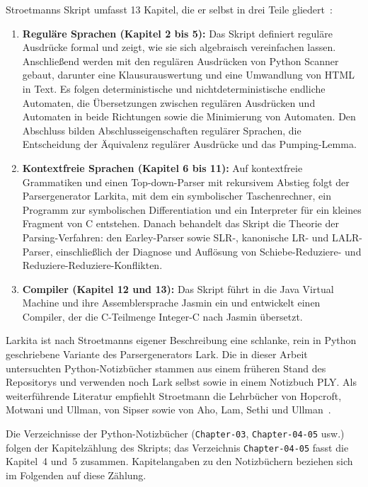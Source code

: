 Stroetmanns Skript umfasst 13 Kapitel, die er selbst in drei Teile gliedert~\cite{stroetmann2026formal}:
\begin{enumerate}
  \item \textbf{Reguläre Sprachen (Kapitel 2 bis 5):} Das Skript definiert reguläre Ausdrücke formal und zeigt, wie sie sich algebraisch vereinfachen lassen.
  Anschließend werden mit den regulären Ausdrücken von Python Scanner gebaut, darunter eine Klausurauswertung und eine Umwandlung von HTML in Text.
  Es folgen deterministische und nichtdeterministische endliche Automaten, die Übersetzungen zwischen regulären Ausdrücken und Automaten in beide Richtungen sowie die Minimierung von Automaten.
  Den Abschluss bilden Abschlusseigenschaften regulärer Sprachen, die Entscheidung der Äquivalenz regulärer Ausdrücke und das Pumping-Lemma.
  \item \textbf{Kontextfreie Sprachen (Kapitel 6 bis 11):} Auf kontextfreie Grammatiken und einen Top-down-Parser mit rekursivem Abstieg folgt der Parsergenerator Larkita, mit dem ein symbolischer Taschenrechner, ein Programm zur symbolischen Differentiation und ein Interpreter für ein kleines Fragment von C entstehen.
  Danach behandelt das Skript die Theorie der Parsing-Verfahren: den Earley-Parser sowie SLR-, kanonische LR- und LALR-Parser, einschließlich der Diagnose und Auflösung von Schiebe-Reduziere- und Reduziere-Reduziere-Konflikten.
  \item \textbf{Compiler (Kapitel 12 und 13):} Das Skript führt in die Java Virtual Machine und ihre Assemblersprache Jasmin ein und entwickelt einen Compiler, der die C-Teilmenge Integer-C nach Jasmin übersetzt.
\end{enumerate}

Larkita ist nach Stroetmanns eigener Beschreibung eine schlanke, rein in Python geschriebene Variante des Parsergenerators Lark.
Die in dieser Arbeit untersuchten Python-Notizbücher stammen aus einem früheren Stand des Repositorys und verwenden noch Lark selbst sowie in einem Notizbuch PLY.
Als weiterführende Literatur empfiehlt Stroetmann die Lehrbücher von Hopcroft, Motwani und Ullman, von Sipser sowie von Aho, Lam, Sethi und Ullman~\cite{hopcroft2006automata,sipser2012introduction,aho2006compilers}.

Die Verzeichnisse der Python-Notizbücher (\texttt{Chapter-03}, \texttt{Chapter-04-05} usw.) folgen der Kapitelzählung des Skripts; das Verzeichnis \texttt{Chapter-04-05} fasst die Kapitel~4 und~5 zusammen.
Kapitelangaben zu den Notizbüchern beziehen sich im Folgenden auf diese Zählung.

